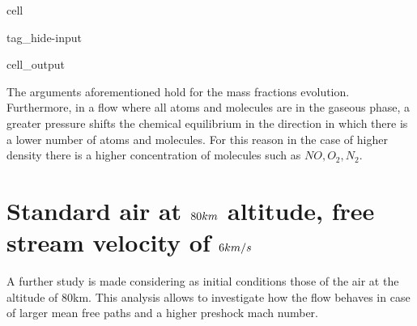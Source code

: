 \documentclass[letterpaper,10pt,english]{jupyterBook}
\begin{document}
\begin{sphinxuseclass}{cell}
\begin{sphinxuseclass}{tag_hide-input}\begin{sphinxVerbatimOutput}

\begin{sphinxuseclass}{cell_output}
\noindent{}

\end{sphinxuseclass}\end{sphinxVerbatimOutput}

\end{sphinxuseclass}
\end{sphinxuseclass}
\sphinxAtStartPar
The arguments aforementioned hold for the mass fractions evolution. Furthermore, in a flow where all atoms and molecules are in the gaseous phase, a greater pressure shifts the chemical equilibrium in the direction in which there is a lower number of atoms and molecules. For this reason in the case of higher density there is a higher concentration of molecules such as \(NO, O_2, N_2\).


\section{Standard air at \protect\(80 km\protect\) altitude, free stream velocity of \protect\(6 km/s\protect\)}
\label{\detokenize{Results/Results:standard-air-at-80-km-altitude-free-stream-velocity-of-6-km-s}}
\sphinxAtStartPar
A further study is made considering as initial conditions those of the air at the altitude of 80km. This analysis allows to investigate how the flow behaves in case of larger mean free paths and a higher pre\sphinxhyphen{}shock mach number.
\end{document}
